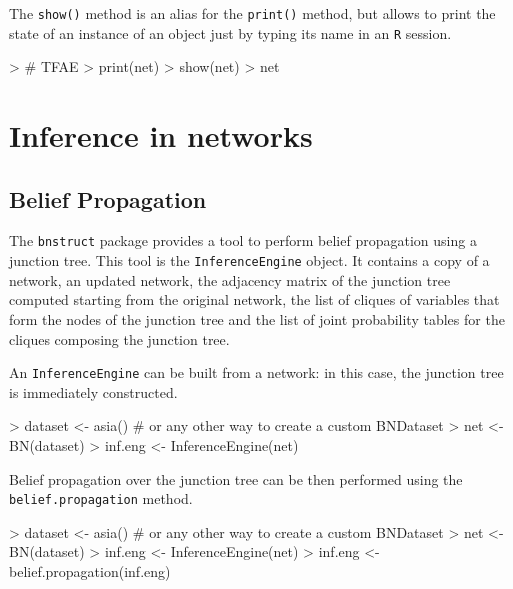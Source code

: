 \documentclass{article}
\newcommand{\Robject}[1]{{\texttt{#1}}}
\newcommand{\Rpackage}[1]{{\texttt{#1}}}
\newcommand{\Rmethod}[1]{{\texttt{#1}}}
\begin{document}
The \Rmethod{show()} method is an alias for the \Rmethod{print()} method, but allows to print the state of an instance of an object
just by typing its name in an \texttt{R} session.
\begin{Schunk}
\begin{Sinput}
> # TFAE
> print(net)
> show(net)
> net
\end{Sinput}
\end{Schunk}


\section{Inference in networks}
\subsection{Belief Propagation}
The \Rpackage{bnstruct} package provides a tool to perform belief propagation using a junction tree.
This tool is the \Robject{InferenceEngine} object.
It contains a copy of a network, an updated network, the adjacency matrix of the junction tree computed
starting from the original network, the list of cliques of variables that form the nodes of the junction tree
and the list of joint probability tables for the cliques composing the junction tree.

An \Robject{InferenceEngine} can be built from a network: in this case, the junction tree is immediately constructed.
\begin{Schunk}
\begin{Sinput}
> dataset <- asia() # or any other way to create a custom BNDataset
> net     <- BN(dataset)
> inf.eng <- InferenceEngine(net)
\end{Sinput}
\end{Schunk}

Belief propagation over the junction tree can be then performed using the \Rmethod{belief.propagation} method.
\begin{Schunk}
\begin{Sinput}
> dataset <- asia() # or any other way to create a custom BNDataset
> net     <- BN(dataset)
> inf.eng <- InferenceEngine(net)
> inf.eng <- belief.propagation(inf.eng)
\end{Sinput}
\end{Schunk}
\end{document}
